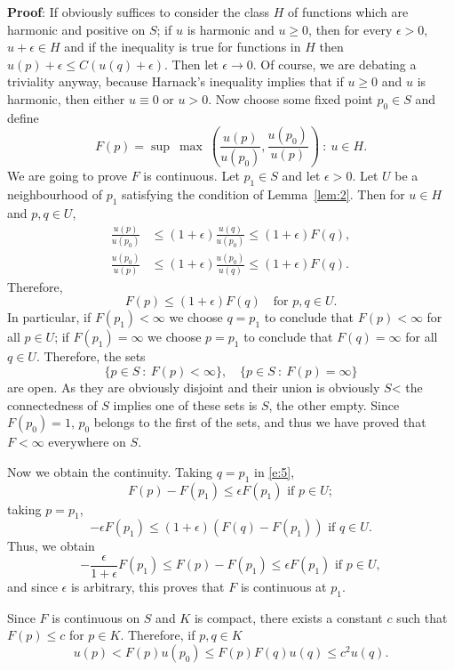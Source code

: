 \documentclass[a4paper,11pt]{article}
\begin{document}
\begin{mdframed}
  \textbf{Proof}:
  If obviously suffices to consider the class $H$ of functions which
  are harmonic and positive on $S$; if $u$ is harmonic and $u \ge 0$,
  then for every $\epsilon > 0$, $u + \epsilon \in H$ and if the
  inequality is true for functions in $H$ then $u(p) + \epsilon \le
  C(u(q) + \epsilon)$.  Then let $\epsilon \to 0$.  Of course, we are
  debating a triviality anyway, because Harnack's inequality implies
  that if $u \ge 0$ and $u$ is harmonic, then either $u \equiv 0$ or
  $u> 0$.  Now choose some fixed point $p_0 \in S$ and define
  $$
  F(p) = \sup\ \max\ (\frac{u(p)}{u(p_0)}, \frac{u(p_0)}{u(p)}) ~:~ u
  \in H.
  $$
  We are going to prove $F$ is continuous.  Let $p_1 \in S$ and let
  $\epsilon > 0$.  Let $U$ be a neighbourhood of $p_1$ satisfying the
  condition of Lemma~\ref{lem:2}.  Then for $u \in H$ and $p,q\in U$,
  $$
  \begin{aligned}
    \frac{u(p)}{u(p_0)} &\le (1 + \epsilon) \frac{u(q)}{u(p_0)}
    \le (1 + \epsilon) F(q),\\
    \frac{u(p_0)}{u(p)} &\le (1 + \epsilon) \frac{u(p_0)}{u(q)}
    \le (1 + \epsilon) F(q).
  \end{aligned}
  $$
  Therefore,
  \begin{equation}
    \label{e:5}
    F(p) \le (1 + \epsilon) F(q) \quad \text{for }p,q\in U.
  \end{equation}
  In particular, if $F(p_1) < \infty$ we choose $q = p_1$ to conclude
  that $F(p) < \infty$ for all $p \in U$; if $F(p_1) = \infty$ we
  choose $p=p_1$ to conclude that $F(q) = \infty$ for all $q \in U$.
  Therefore, the sets
  $$
  \{p \in S ~:~ F(p) < \infty\}, \quad
  \{p \in S ~:~ F(p) = \infty\}
  $$
  are open.   As they are obviously disjoint and their union is
  obviously $S$< the connectedness of $S$ implies one of these sets is
  $S$, the other empty.  Since $F(p_0) = 1$, $p_0$ belongs to the
  first of the sets, and thus we have proved that $F < \infty$
  everywhere on $S$.

  Now we obtain the continuity.  Taking $q = p_1$ in \eqref{e:5},
  $$
  F(p) - F(p_1) \le \epsilon F(p_1) \text{ if } p \in U;
  $$
  taking $p = p_1$,
  $$
  -\epsilon F(p_1) \le (1 + \epsilon) (F(q) - F(p_1)) \text{ if }
  q \in U.
  $$
  Thus, we obtain
  $$
  - \frac{\epsilon}{1+\epsilon} F(p_1) \le F(p) - F(p_1) \le \epsilon
  F(p_1) \text{ if } p \in U,
  $$
  and since $\epsilon$ is arbitrary, this proves that $F$ is
  continuous at $p_1$.

  Since $F$ is continuous on $S$ and $K$ is compact, there exists a
  constant $c$ such that $F(p) \le c$ for $p \in K$.  Therefore, if
  $p, q \in K$
  $$
  u(p) < F(p) u(p_0) \le F(p) F(q) u(q) \le c^2 u(q).
  $$
\end{mdframed}
\end{document}
